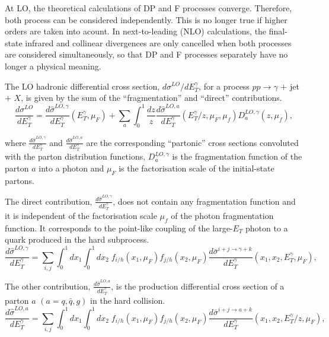 \documentclass[12pt, twoside]{article}
\numberwithin{equation}{section}
\numberwithin{figure}{section}
\begin{document}
At LO, the theoretical calculations of DP and F processes converge. Therefore, both process can be considered independently. This is no longer true if higher orders are taken into acount. In next-to-leading (NLO) calculations, the final-state infrared and collinear divergences are only cancelled when both processes are considered simultaneously, so that DP and F processes separately have no longer a physical meaning.

The LO hadronic differential cross section, $d \sigma^{LO} / d E^{\gamma}_{T}$, for a process $p p \rightarrow{} \gamma$ $+$ jet $+$ $X$, is given by the sum of the ``fragmentation'' and ``direct'' contributions.
\begin{equation}    \label{eq:LOHadronicDifferentialCrossSection}
    \frac{d \sigma^{LO}}{d E^{\gamma}_{T}} = \frac{d \hat{\sigma}^{LO, \gamma}}{d E^{\gamma}_{T}} \left(E^{\gamma}_{T}, \mu_{F} \right) + \sum_{a} \int^{1}_{0} \frac{dz}{z} \frac{d \hat{\sigma}^{LO, a}}{d E^{\gamma}_{T}} \left( E^{\gamma}_{T} / z, \mu_{F}, \mu_{f} \right) D^{LO,\gamma}_{a} \left(z, \mu_{f} \right) ,
\end{equation}

where $\frac{d \hat{\sigma}^{LO, \gamma}}{d E^{\gamma}_{T}}$ and $\frac{d \hat{\sigma}^{LO, a}}{d E^{\gamma}_{T}}$ are the corresponding ``partonic'' cross sections convoluted with the parton distribution functions, $D^{LO,\gamma}_{a}$ is the fragmentation function of the parton $a$ into a photon and $\mu_{F}$ is the factorisation scale of the initial-state partons.

The direct contribution, $\frac{d \hat{\sigma}^{LO, \gamma}}{d E^{\gamma}_{T}}$, does not contain any fragmentation function and it is independent of the factorisation scale $\mu_{f}$ of the photon fragmentation function. It corresponds to the point-like coupling of the large-$E_{T}$ photon to a quark produced in the hard subprocess.
\begin{equation}    \label{eq:LOPhotonDifferentialCrossSection}
    \frac{d \hat{\sigma}^{LO, \gamma}}{d E^{\gamma}_{T}} = \sum_{i,j} \int^{1}_{0} dx_{1} \int^{1}_{0} dx_{2} \; f_{i/h} \left(x_{1}, \mu_{F} \right) f_{j/h} \left(x_{2}, \mu_{F} \right) \frac{d \bar{\sigma}^{i+j \rightarrow{} \gamma+k}}{d E^{\gamma}_{T}} \left(x_{1}, x_{2}, E^{\gamma}_{T}, \mu_{F} \right),
\end{equation}

The other contribution, $\frac{d \hat{\sigma}^{LO, a}}{d E^{\gamma}_{T}}$, is the production differential cross section of a parton $a$ $\left(a = q, \bar{q}, g \right)$ in the hard collision.
\begin{equation}    \label{eq:LOPartonDifferentialCrossSection}
    \frac{d \hat{\sigma}^{LO, a}}{d E^{\gamma}_{T}} = \sum_{i,j} \int^{1}_{0} dx_{1} \int^{1}_{0} dx_{2} \; f_{i/h} \left(x_{1}, \mu_{F} \right) f_{j/h} \left(x_{2}, \mu_{F} \right) \frac{d \bar{\sigma}^{i+j \rightarrow{} a+k}}{d E^{\gamma}_{T}} \left(x_{1}, x_{2}, E^{\gamma}_{T}/z, \mu_{F} \right),
\end{equation}
\end{document}
